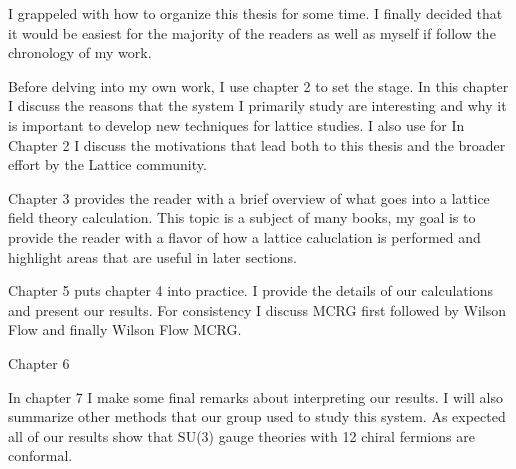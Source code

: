 
I grappeled with how to organize this thesis for some time.
I finally decided that it would be easiest for the majority of the readers as well as myself if follow the chronology of my work.

Before delving into my own work, I use chapter 2 to set the stage.
In this chapter I discuss the reasons that the system I primarily study are interesting and why it is important to develop new techniques for  lattice studies.
I also use for In Chapter 2 I discuss the motivations that lead both to this thesis and the broader effort by the Lattice community.

Chapter 3 provides the reader with a brief overview of what goes into a lattice field theory calculation.  
This topic is a subject of many books, my goal is to provide the reader with a flavor of how a lattice caluclation is performed and highlight areas that are useful in later sections.


Chapter 5 puts chapter 4 into practice.
I provide the details of our calculations and present our results.
For consistency I discuss MCRG first followed by Wilson Flow and finally Wilson Flow MCRG.

Chapter 6

In chapter 7 I make some final remarks about interpreting our results.
I will also summarize other methods that our group used to study this system.
As expected all of our results show that SU(3) gauge theories with 12 chiral fermions are conformal.
